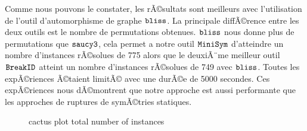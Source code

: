 Comme nous pouvons le constater, les rÃ©sultats sont meilleurs  avec l'utilisation de l'outil d'automorphisme de 
graphe $\texttt{bliss}$. La principale diffÃ©rence entre les deux outils est le nombre de permutations obtenues.
 $\texttt{bliss}$ nous donne plus de permutations que $\texttt{saucy3}$, cela permet a notre outil $\texttt{MiniSym}$ d'atteindre 
un nombre d'instances rÃ©solues de 775 alors que le deuxiÃ¨me meilleur outil $\texttt{BreakID}$ atteint un nombre d'instances rÃ©solues de 749 avec $\texttt{bliss}$. Toutes les expÃ©riences Ã©taient limitÃ© avec une durÃ©e de 5000 secondes.
Ces expÃ©riences nous dÃ©montrent que notre approche est aussi performante que les approches de ruptures de symÃ©tries statiques.
\begin{figure}[!htbp]
 \centering
 \qquad
 \caption{cactus plot  total number of instances}%
 \label{fig:frcactus}%
\end{figure}
